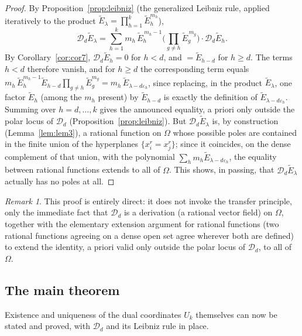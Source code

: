 \documentclass[11pt]{article}
\theoremstyle{remark}
\newtheorem{remark}[theorem]{Remark}
\begin{document}
\begin{proof}
By Proposition~\ref{prop:leibniz} (the generalized Leibniz rule, applied iteratively to the product $\widetilde E_\lambda=\prod_{h=1}^k\widetilde E_h^{m_h}$),
\[
\mathcal D_d\widetilde E_\lambda = \sum_{h=1}^{k} m_h\,\widetilde E_h^{\,m_h-1}\Big(\prod_{g\ne h}\widetilde E_g^{\,m_g}\Big)\cdot \mathcal D_d\widetilde E_h.
\]
By Corollary~\ref{cor:cor7}, $\mathcal D_d\widetilde E_h=0$ for $h<d$, and $=\widetilde E_{h-d}$ for $h\ge d$. The terms $h<d$ therefore vanish, and for $h\ge d$ the corresponding term equals $m_h\,\widetilde E_h^{m_h-1}\widetilde E_{h-d}\prod_{g\ne h}\widetilde E_g^{m_g} = m_h\,\widetilde E_{\lambda-d\varepsilon_h}$, since replacing, in the product $\widetilde E_\lambda$, one factor $\widetilde E_h$ (among the $m_h$ present) by $\widetilde E_{h-d}$ is exactly the definition of $\widetilde E_{\lambda - d\varepsilon_h}$. Summing over $h=d,\dots,k$ gives the announced equality, a priori only outside the polar locus of $\mathcal D_d$ (Proposition~\ref{prop:leibniz}). But $\mathcal D_d\widetilde E_\lambda$ is, by construction (Lemma~\ref{lem:lem3}), a rational function on $\Omega$ whose possible poles are contained in the finite union of the hyperplanes $\{x_i^r=x_j^r\}$; since it coincides, on the dense complement of that union, with the polynomial $\sum_hm_h\widetilde E_{\lambda-d\varepsilon_h}$, the equality between rational functions extends to all of $\Omega$. This shows, in passing, that $\mathcal D_d\widetilde E_\lambda$ actually has no poles at all.
\end{proof}

\begin{remark}
This proof is entirely direct: it does not invoke the transfer principle, only the immediate fact that $\mathcal D_d$ is a derivation (a rational vector field) on $\Omega$, together with the elementary extension argument for rational functions (two rational functions agreeing on a dense open set agree wherever both are defined) to extend the identity, a priori valid only outside the polar locus of $\mathcal D_d$, to all of $\Omega$.
\end{remark}

\subsection{The main theorem}

Existence and uniqueness of the dual coordinates $U_k$ themselves can now be stated and proved, with $\mathcal D_d$ and its Leibniz rule in place.
\end{document}
